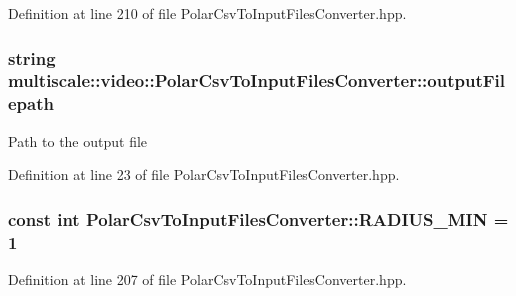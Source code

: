 \-Definition at line 210 of file \-Polar\-Csv\-To\-Input\-Files\-Converter.\-hpp.

\hypertarget{classmultiscale_1_1video_1_1PolarCsvToInputFilesConverter_a1033d31c9bfc7ccad08337c7b0fa6e6e}{
\subsubsection[{output\-Filepath}]{\setlength{\rightskip}{0pt plus 5cm}string {\bf multiscale\-::video\-::\-Polar\-Csv\-To\-Input\-Files\-Converter\-::output\-Filepath}}}\label{classmultiscale_1_1video_1_1PolarCsvToInputFilesConverter_a1033d31c9bfc7ccad08337c7b0fa6e6e}
\-Path to the output file 

\-Definition at line 23 of file \-Polar\-Csv\-To\-Input\-Files\-Converter.\-hpp.

\hypertarget{classmultiscale_1_1video_1_1PolarCsvToInputFilesConverter_aeb8eeef6a83cd99ebfc47053a1ec99a7}{
\subsubsection[{\-R\-A\-D\-I\-U\-S\-\_\-\-M\-I\-N}]{\setlength{\rightskip}{0pt plus 5cm}const int {\bf \-Polar\-Csv\-To\-Input\-Files\-Converter\-::\-R\-A\-D\-I\-U\-S\-\_\-\-M\-I\-N} = 1}}\label{classmultiscale_1_1video_1_1PolarCsvToInputFilesConverter_aeb8eeef6a83cd99ebfc47053a1ec99a7}


\-Definition at line 207 of file \-Polar\-Csv\-To\-Input\-Files\-Converter.\-hpp.

